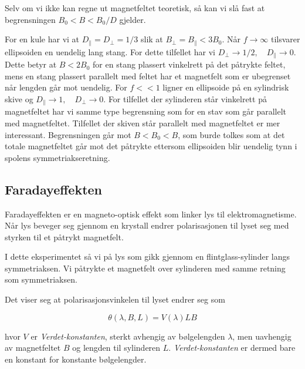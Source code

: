 \documentclass[a4paper,11pt, twocolumn]{article}
\begin{document}
Selv om vi ikke kan regne ut magnetfeltet teoretisk, så kan vi slå fast at begrensningen $B_0<B<B_0/D$ gjelder.

For en kule har vi at $D_\parallel=D_\perp=1/3$ slik at $B_\perp = B_\parallel <3B_0$. Når $f\rightarrow\infty$ tilsvarer ellipsoiden en uendelig lang stang. For dette tilfellet har vi $D_\perp\rightarrow 1/2, \quad D_\parallel\rightarrow 0$. Dette betyr at $B<2B_0$ for en stang plassert vinkelrett på det påtrykte feltet, mens en stang plassert parallelt med feltet har et magnetfelt som er ubegrenset når lengden går mot uendelig. For $f<<1$ ligner en ellipsoide på en sylindrisk skive og $D_\parallel\rightarrow 1, \quad D_\perp\rightarrow 0$. For tilfellet der sylinderen står vinkelrett på magnetfeltet har vi samme type begrensning som for en stav som går parallelt med magnetfeltet. Tilfellet der skiven står parallelt med magnetfeltet er mer interessant. Begrensningen går mot $B<B_0<B$, som burde tolkes som at det totale magnetfeltet går mot det påtrykte ettersom ellipsoiden blir uendelig tynn i spolens symmetriakseretning.

\subsection{Faradayeffekten}
Faradayeffekten er en magneto-optisk effekt som linker lys til elektromagnetisme. Når lys beveger seg gjennom en krystall endrer polarisasjonen til lyset seg med styrken til et påtrykt magnetfelt.

I dette eksperimentet så vi på lys som gikk gjennom en flintglass-sylinder langs symmetriaksen. Vi påtrykte et magnetfelt over sylinderen med samme retning som symmetriaksen.

Det viser seg at polarisasjonsvinkelen til lyset endrer seg som

\begin{equation}
	\theta(\lambda, B, L) = V(\lambda)LB
	\label{eq:verdet}
\end{equation}

hvor $V$ er \textit{Verdet-konstanten}, sterkt avhengig av bølgelengden $\lambda$, men uavhengig av magnetfeltet $B$ og lengden til sylinderen $L$. \textit{Verdet-konstanten} er dermed bare en konstant for konstante bølgelengder.
\end{document}
